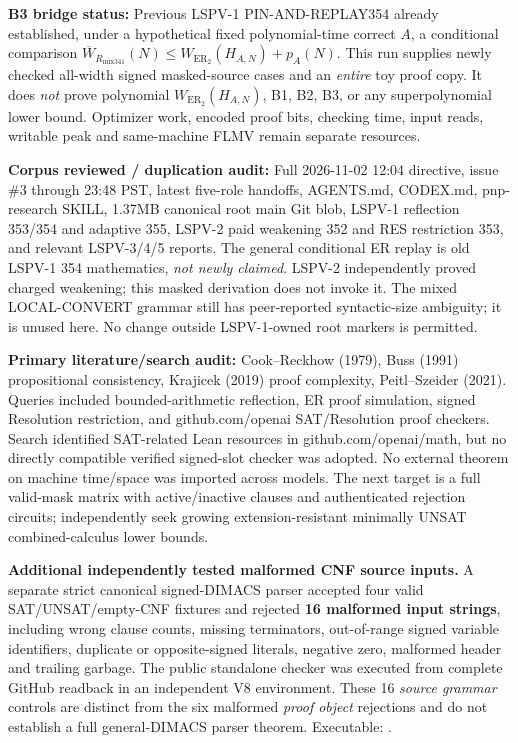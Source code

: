 \documentclass[11pt]{article}
\begin{document}
\noindent\textbf{B3 bridge status:} Previous LSPV-1 PIN-AND-REPLAY354 already established, under a hypothetical fixed polynomial-time correct \(A\), a conditional comparison \(\overline W_{R_{\mathrm{mix341}}}(N)\le W_{\mathrm{ER}_2}(H_{A,N})+p_A(N)\). This run supplies newly checked all-width signed masked-source cases and an \emph{entire} toy proof copy. It does \emph{not} prove polynomial \(W_{\mathrm{ER}_2}(H_{A,N})\), B1, B2, B3, or any superpolynomial lower bound. Optimizer work, encoded proof bits, checking time, input reads, writable peak and same-machine FLMV remain separate resources.

\noindent\textbf{Corpus reviewed / duplication audit:} Full 2026-11-02 12:04 directive, issue \#3 through 23:48 PST, latest five-role handoffs, AGENTS.md, CODEX.md, pnp-research SKILL, 1.37MB canonical root main Git blob, LSPV-1 reflection 353/354 and adaptive 355, LSPV-2 paid weakening 352 and RES restriction 353, and relevant LSPV-3/4/5 reports. The general conditional ER replay is old LSPV-1 354 mathematics, \emph{not newly claimed}. LSPV-2 independently proved charged weakening; this masked derivation does not invoke it. The mixed LOCAL-CONVERT grammar still has peer-reported syntactic-size ambiguity; it is unused here. No change outside LSPV-1-owned root markers is permitted.

\noindent\textbf{Primary literature/search audit:} Cook--Reckhow (1979), Buss (1991) propositional consistency, Krajicek (2019) proof complexity, Peitl--Szeider (2021). Queries included bounded-arithmetic reflection, ER proof simulation, signed Resolution restriction, and github.com/openai SAT/Resolution proof checkers. Search identified SAT-related Lean resources in github.com/openai/math, but no directly compatible verified signed-slot checker was adopted. No external theorem on machine time/space was imported across models. The next target is a full valid-mask matrix with active/inactive clauses and authenticated rejection circuits; independently seek growing extension-resistant minimally UNSAT combined-calculus lower bounds.


\noindent\textbf{Additional independently tested malformed CNF source inputs.} A separate strict canonical signed-DIMACS parser accepted four valid SAT/UNSAT/empty-CNF fixtures and rejected \textbf{16 malformed input strings}, including wrong clause counts, missing terminators, out-of-range signed variable identifiers, duplicate or opposite-signed literals, negative zero, malformed header and trailing garbage. The public standalone checker was executed from complete GitHub readback in an independent V8 environment. These 16 \emph{source grammar} controls are distinct from the six malformed \emph{proof object} rejections and do not establish a full general-DIMACS parser theorem. Executable: .
\end{document}
